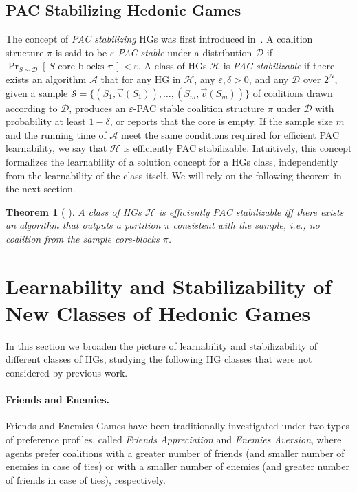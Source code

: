 \documentclass[letterpaper]{article} %
\newtheorem{theorem}{Theorem}[section]
\let\eps\varepsilon
\newcommand{\distribution}{\mathcal{D}}
\newcommand{\Prob}[2]{\Pr_{#2}\left[\,#1\,\right]}
\newcommand{\hclass}{\ensuremath{\mathcal{H}}}
\newcommand{\sample}{\ensuremath{\mathcal{S}}}
\begin{document}
\subsection{PAC Stabilizing Hedonic Games}
The concept of \emph{PAC stabilizing} HGs was first introduced in~\cite{SliwinskiZ17}. A coalition structure $\pi$ is said to be \emph{$\eps$-PAC stable} under a distribution $\distribution$ if
$\Prob{S \text{ core-blocks } \pi}{S\sim \distribution} < \eps$.
A class of HGs $\hclass$ is \emph{PAC stabilizable} if there exists an algorithm $\mathcal{A}$ that for any HG in $\hclass$, any $\eps, \delta>0$, and any $\distribution$ over $2^N$, given a sample $\sample =\{( S_1, \vec{v}(S_1)), \ldots, ( S_m, \vec{v}(S_m))\}$ of coalitions drawn according to $\distribution$, produces an $\eps$-PAC stable coalition structure $\pi$ under $\distribution$ with probability at least $1-\delta$, or reports that the core is empty. If the sample size $m$ and the running time of $\mathcal{A}$ meet the same conditions required for efficient PAC learnability, we say that $\hclass$ is efficiently PAC stabilizable.
%
Intuitively, this concept formalizes the learnability of a solution concept for a HGs class, independently from the learnability of the class itself. 
We will rely on the following theorem in the next section.
\begin{theorem}[\citeauthor{JhaZick20} \citeyear{JhaZick20}]\label{thm:PAC_stabilizability}
A class of HGs $\mathcal{H}$ is efficiently PAC stabilizable iff there exists an algorithm that outputs a partition $\pi$ consistent with the sample, i.e., no coalition from the sample core-blocks $\pi$.
\end{theorem}

\section{Learnability and Stabilizability of New Classes of Hedonic Games}\label{sec:new_classes}
In this section we broaden the picture of learnability and stabilizability of different classes of HGs, studying the following HG classes that were not considered by previous work.

\paragraph{Friends and Enemies.}
Friends and Enemies Games have been traditionally investigated under two types of preference profiles, called \emph{Friends Appreciation} and \emph{Enemies Aversion}, where agents prefer  coalitions with a greater number of friends (and smaller number of enemies in case of ties) or with a smaller number of enemies (and greater number of friends in case of ties), respectively. 
\end{document}
